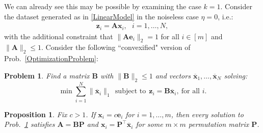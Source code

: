 \documentclass{ucbthesis}
\newtheorem{conjecture}{Conjecture}
\newtheorem{problem}{Problem}
\newtheorem{proposition}{Proposition}
\begin{document}
We can already see this may be possible by examining the case $k=1$. Consider the dataset generated as in \eqref{LinearModel} in the noiseless case $\eta = 0$, i.e.:
\begin{align}\label{LinearModel}
\mathbf{z}_i = \mathbf{A}\mathbf{x}_i,\ \ \  \text{$i=1,\ldots,N$},
\end{align}
with the additional constraint that $\|\mathbf{Ae}_i\|_2 = 1$ for all $i \in [m]$ and  $\|\mathbf{A}\|_2 \leq 1$. Consider the following ``convexified" version of Prob.~\ref{OptimizationProblem}:

\begin{problem}\label{ConvexifiedOptimizationProblem}
Find a matrix $\mathbf{B}$ with $\|\mathbf{B}\|_2 \leq 1$ and vectors \mbox{$\mathbf{\overline x}_1, \ldots, \mathbf{\overline x}_N$} solving:
\begin{equation}\label{l1min}
\min \sum_{i = 1}^N \|\mathbf{\overline x}_{i}\|_1 \ \
\text{subject to} \ \ \mathbf{z}_i = \mathbf{B}\mathbf{\overline x}_i, \ \text{for all $i$}.
\end{equation}
\end{problem}


\begin{proposition}
Fix $c > 1$. If $\mathbf{x}_i = c\mathbf{e}_i$ for $i = 1, \ldots, m$, then every solution to Prob.~\ref{ConvexifiedOptimizationProblem} satisfies $\mathbf{A} = \mathbf{BP}$ and $\mathbf{x}_i = \mathbf{P}^\top \mathbf{\overline x}_i$ for some $m \times m$ permutation matrix $\mathbf{P}$.
\end{proposition}
\end{document}
